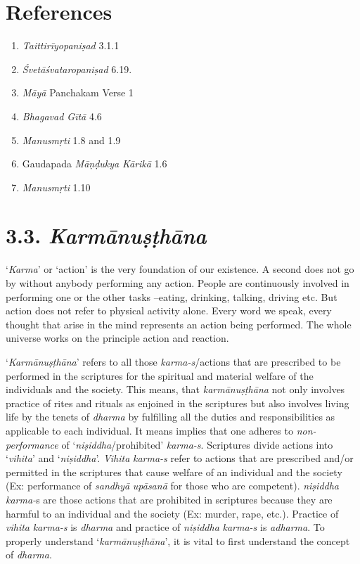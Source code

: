 \section*{References}

\begin{enumerate}
\itemsep=0pt
\item
  \emph{Taittirīyopaniṣad} 3.1.1
\item
  \emph{Śvetāśvataropaniṣad} 6.19.
\item
  \emph{Māyā} Panchakam Verse 1
\item
  \emph{Bhagavad Gītā} 4.6
\item
  \emph{Manusmṛti} 1.8 and 1.9
\item
  Gaudapada \emph{Māṇḍukya} \emph{Kārikā} 1.6
\item
  \emph{Manusmṛti} 1.10
\end{enumerate}

\section*{3.3. \emph{Karmānuṣṭhāna}}

`\emph{Karma}' or `action' is the very foundation of our existence. A second does not go by without anybody performing any action. People are continuously involved in performing one or the other tasks --eating, drinking, talking, driving etc. But action does not refer to physical activity alone. Every word we speak, every thought that arise in the mind represents an action being performed. The whole universe works on the principle action and reaction.

`\emph{Karmānuṣṭhāna}' refers to all those \emph{karma-s}/actions that are prescribed to be performed in the scriptures for the spiritual and material welfare of the individuals and the society. This means, that \emph{karmānuṣṭhāna} not only involves practice of rites and rituals as enjoined in the scriptures but also involves living life by the tenets of \emph{dharma} by fulfilling all the duties and responsibilities as applicable to each individual. It means implies that one adheres to \emph{non-performance} of `\emph{niṣiddha}/prohibited' \emph{karma-s}. Scriptures divide actions into `\emph{vihita}' and `\emph{niṣiddha}'. \emph{Vihita} \emph{karma-s} refer to actions that are prescribed and/or permitted in the scriptures that cause welfare of an individual and the society (Ex: performance of \emph{sandhyā} \emph{upāsanā} for those who are competent). \emph{niṣiddha} \emph{karma-}s are those actions that are prohibited in scriptures because they are harmful to an individual and the society (Ex: murder, rape, etc.). Practice of \emph{vihita} \emph{karma-s} is \emph{dharma} and practice of \emph{niṣiddha} \emph{karma-s} is \emph{adharma}. To properly understand `\emph{karmānuṣṭhāna}', it is vital to first understand the concept of \emph{dharma}.

